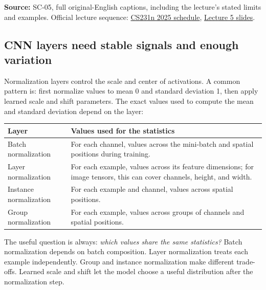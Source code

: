 \textbf{Source:} SC-05, full original-English captions, including the lecture's stated limits and examples. Official lecture sequence: \href{https://cs231n.stanford.edu/2025/schedule.html}{CS231n 2025 schedule}, \href{https://cs231n.stanford.edu/slides/2025/lecture_5.pdf}{Lecture 5 slides}.

\subsection{CNN layers need stable signals and enough variation}\label{04-visual-computing-ii-ch031-cnn-layers-need-stable-signals-and-enough-variation}

Normalization layers control the scale and center of activations. A common pattern is: first normalize values to mean 0 and standard deviation 1, then apply learned scale and shift parameters. The exact values used to compute the mean and standard deviation depend on the layer:

{\def\LTcaptype{none} %
\begin{longtable}[]{@{}
  >{\raggedright\arraybackslash}p{}
  >{\raggedright\arraybackslash}p{}@{}}
\toprule\noalign{}
\begin{minipage}[b]{\linewidth}\raggedright
Layer
\end{minipage} & \begin{minipage}[b]{\linewidth}\raggedright
Values used for the statistics
\end{minipage} \\
\midrule\noalign{}
\endhead
\bottomrule\noalign{}
\endlastfoot
Batch normalization & For each channel, values across the mini-batch and spatial positions during training. \\
Layer normalization & For each example, values across its feature dimensions; for image tensors, this can cover channels, height, and width. \\
Instance normalization & For each example and channel, values across spatial positions. \\
Group normalization & For each example, values across groups of channels and spatial positions. \\
\end{longtable}
}

The useful question is always: \emph{which values share the same statistics?} Batch normalization depends on batch composition. Layer normalization treats each example independently. Group and instance normalization make different trade-offs. Learned scale and shift let the model choose a useful distribution after the normalization step.

